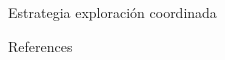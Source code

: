 \documentclass[final]{beamer}
\newlength{\sepwidth}
\newlength{\colwidth}
\newcommand{\separatorcolumn}{\begin{column}{\sepwidth}\end{column}}
\begin{document}
\begin{frame}[t]
\begin{columns}[t]
\begin{column}{\colwidth}
\begin{block}{Estrategia exploración coordinada}
  \end{block}

  \begin{block}{References}

    \nocite{*}
    \footnotesize{}

  \end{block}

\end{column}

\separatorcolumn
\end{columns}
\end{frame}
\end{document}
